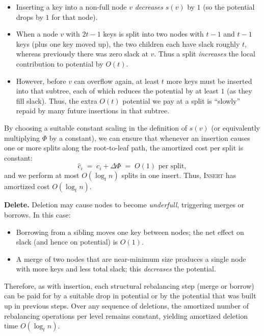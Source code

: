 \documentclass[9pt]{extarticle}
\begin{document}
\begin{itemize}
  \item Inserting a key into a non-full node $v$ \emph{decreases} $s(v)$ by $1$
        (so the potential drops by $1$ for that node).
  \item When a node $v$ with $2t-1$ keys is split into two nodes
        with $t-1$ and $t-1$ keys (plus one key moved up),
        the two children each have slack roughly $t$, whereas previously
        there was zero slack at $v$. Thus a split \emph{increases} the local
        contribution to potential by $O(t)$.
  \item However, before $v$ can overflow again, at least $t$ more keys
        must be inserted into that subtree, each of which reduces the
        potential by at least $1$ (as they fill slack). Thus, the extra
        $O(t)$ potential we pay at a split is ``slowly'' repaid by many
        future insertions in that subtree.
\end{itemize}

By choosing a suitable constant scaling in the definition of $s(v)$
(or equivalently multiplying $\Phi$ by a constant), we can ensure that
whenever an insertion causes one or more splits along the root-to-leaf path,
the amortized cost per split is constant:
\[
  \hat c_i \;=\; c_i + \Delta \Phi \;=\; O(1) \text{ per split},
\]
and we perform at most $O(\log_t n)$ splits in one insert.
Thus, \textsc{Insert} has amortized cost $O(\log_t n)$.

\textbf{Delete.}  
Deletion may cause nodes to become \emph{underfull}, triggering merges or borrows.
In this case:

\begin{itemize}
  \item Borrowing from a sibling moves one key between nodes; the net effect
        on slack (and hence on potential) is $O(1)$.
  \item A merge of two nodes that are near-minimum size produces a single
        node with more keys and less total slack; this \emph{decreases}
        the potential.
\end{itemize}

Therefore, as with insertion, each structural rebalancing step (merge or borrow)
can be paid for by a suitable drop in potential or by the potential that
was built up in previous steps. Over any sequence of deletions, the amortized
number of rebalancing operations per level remains constant, yielding
amortized deletion time $O(\log_t n)$.
\end{document}
